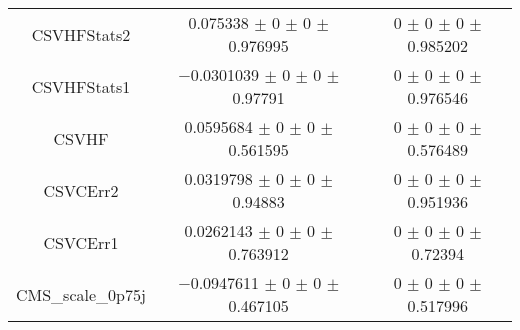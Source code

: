 \begin{table}
\begin{tabular}{ccc}
CSVHFStats2 	& \num{0.075338} $\pm$ \num{0} $\pm$ \num{0} $\pm$ \num{0.976995} 	& \num{0} $\pm$ \num{0} $\pm$ \num{0} $\pm$ \num{0.985202}\\
CSVHFStats1 	& \num{-0.0301039} $\pm$ \num{0} $\pm$ \num{0} $\pm$ \num{0.97791} 	& \num{0} $\pm$ \num{0} $\pm$ \num{0} $\pm$ \num{0.976546}\\
CSVHF 	& \num{0.0595684} $\pm$ \num{0} $\pm$ \num{0} $\pm$ \num{0.561595} 	& \num{0} $\pm$ \num{0} $\pm$ \num{0} $\pm$ \num{0.576489}\\
CSVCErr2 	& \num{0.0319798} $\pm$ \num{0} $\pm$ \num{0} $\pm$ \num{0.94883} 	& \num{0} $\pm$ \num{0} $\pm$ \num{0} $\pm$ \num{0.951936}\\
CSVCErr1 	& \num{0.0262143} $\pm$ \num{0} $\pm$ \num{0} $\pm$ \num{0.763912} 	& \num{0} $\pm$ \num{0} $\pm$ \num{0} $\pm$ \num{0.72394}\\
CMS\_scale\_0p75j 	& \num{-0.0947611} $\pm$ \num{0} $\pm$ \num{0} $\pm$ \num{0.467105} 	& \num{0} $\pm$ \num{0} $\pm$ \num{0} $\pm$ \num{0.517996}\\
\bottomrule
\end{tabular}
\end{table}